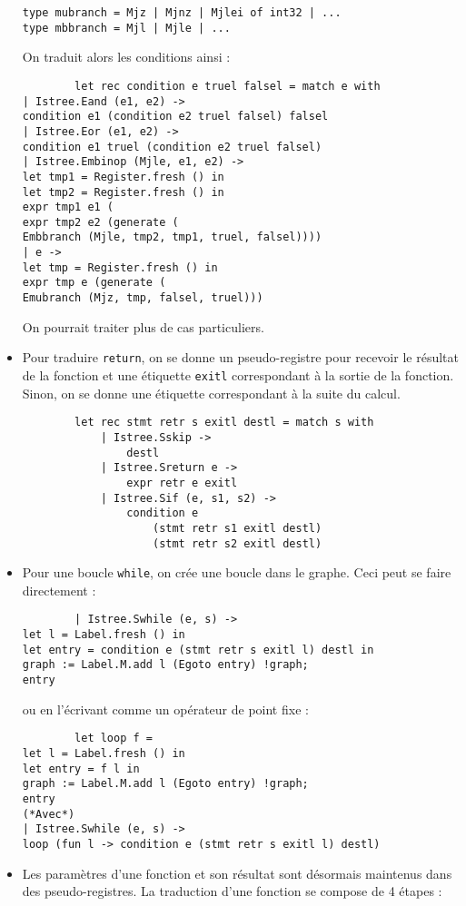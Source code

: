 \documentclass{cours}
\begin{document}
\begin{itemize}
\begin{verbatim}
type mubranch = Mjz | Mjnz | Mjlei of int32 | ...
type mbbranch = Mjl | Mjle | ...
    \end{verbatim}
          On traduit alors les conditions ainsi :
          \begin{verbatim}
        let rec condition e truel falsel = match e with
| Istree.Eand (e1, e2) ->
condition e1 (condition e2 truel falsel) falsel
| Istree.Eor (e1, e2) ->
condition e1 truel (condition e2 truel falsel)
| Istree.Embinop (Mjle, e1, e2) ->
let tmp1 = Register.fresh () in
let tmp2 = Register.fresh () in
expr tmp1 e1 (
expr tmp2 e2 (generate (
Embbranch (Mjle, tmp2, tmp1, truel, falsel))))
| e ->
let tmp = Register.fresh () in
expr tmp e (generate (
Emubranch (Mjz, tmp, falsel, truel)))
    \end{verbatim}
          On pourrait traiter plus de cas particuliers.
    \item Pour traduire \texttt{return}, on se donne un pseudo-registre pour recevoir le résultat de la fonction et une étiquette \texttt{exitl} correspondant à la sortie de la fonction. Sinon, on se donne une étiquette correspondant à la suite du calcul.
          \begin{verbatim}
        let rec stmt retr s exitl destl = match s with
            | Istree.Sskip ->
                destl
            | Istree.Sreturn e ->
                expr retr e exitl
            | Istree.Sif (e, s1, s2) ->
                condition e
                    (stmt retr s1 exitl destl)
                    (stmt retr s2 exitl destl)
    \end{verbatim}
    \item Pour une boucle \texttt{while}, on crée une boucle dans le graphe. Ceci peut se faire directement :
          \begin{verbatim}
        | Istree.Swhile (e, s) ->
let l = Label.fresh () in
let entry = condition e (stmt retr s exitl l) destl in
graph := Label.M.add l (Egoto entry) !graph;
entry
    \end{verbatim}
          ou en l'écrivant comme un opérateur de point fixe :
          \begin{verbatim}
        let loop f =
let l = Label.fresh () in
let entry = f l in
graph := Label.M.add l (Egoto entry) !graph;
entry
(*Avec*)
| Istree.Swhile (e, s) ->
loop (fun l -> condition e (stmt retr s exitl l) destl)
    \end{verbatim}
    \item Les paramètres d'une fonction et son résultat sont désormais maintenus dans des pseudo-registres. La traduction d'une fonction se compose de 4 étapes :

\end{itemize}
\end{document}
